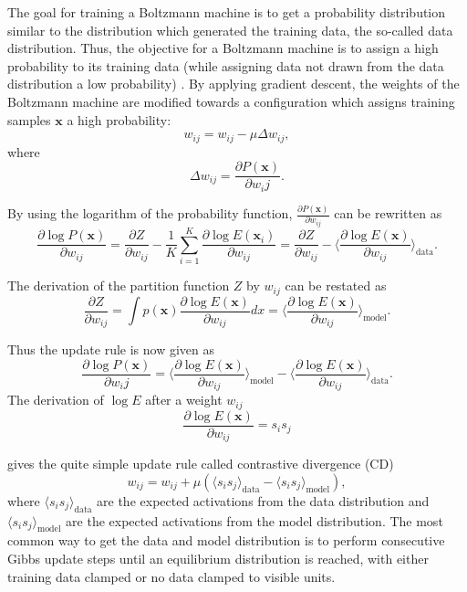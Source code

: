 The goal for training a Boltzmann machine is to get a probability distribution similar to the distribution which generated the training data, the so-called data distribution.
Thus, the objective for a Boltzmann machine is to assign a high probability to its training data (while assigning data not drawn from the data distribution a low probability) \cite{ackley1985learning} \cite{hinton2002training} \cite{Woodford2002} \cite{Bengio2009}.
By applying gradient descent, the weights of the Boltzmann machine are modified towards a configuration which assigns training samples $\textbf{x}$ a high probability:
\[
w_{ij} = w_{ij} - \mu \Delta w_{ij},
\]
where
\[
\Delta w_{ij} = \frac{\partial P(\textbf{x})}{\partial w_ij}.
\]

By using the logarithm of the probability function, $\frac{\partial P(\textbf{x})}{\partial w_{ij}}$ can be rewritten as
\[
\frac{\partial \log P(\textbf{x})}{\partial w_{ij}} = \frac{\partial Z}{\partial w_{ij}} - \frac{1}{K} \sum_{i=1}^K \frac{\partial \log E(\textbf{x}_i)}{\partial w_{ij}} =  \frac{\partial Z}{\partial w_{ij}} - \Big \langle \frac{\partial \log E(\textbf{x})}{\partial w_{ij}} \Big \rangle_{\text{data}}.
\]    

The derivation of the partition function $Z$ by $w_{ij}$ can be restated as
\[
 \frac{\partial Z}{\partial w_{ij}} = \int p(\textbf{x}) \frac{\partial \log E(\textbf{x})}{\partial w_{ij}} dx = \Big \langle \frac{\partial \log E(\textbf{x})}{\partial w_{ij}} \Big \rangle_{\text{model}}.
\]

Thus the update rule is now given as
\[
\frac{\partial \log P(\textbf{x})}{\partial w_ij} =  \Big \langle \frac{\partial \log E(\textbf{x})}{\partial w_{ij}} \Big \rangle_{\text{model}} - \Big \langle \frac{\partial \log E(\textbf{x})}{\partial w_{ij}} \Big \rangle_{\text{data}}.
\]
The derivation of $\log E$ after a weight $w_{ij}$
\[
\frac{\partial \log E(\textbf{x})}{\partial w_{ij}} = s_i s_j
\]

gives the quite simple update rule called contrastive divergence (CD)
\[
w_{ij}= w_{ij} + \mu ( \langle s_i s_j \rangle_{\text{data}} - \langle s_i s_j \rangle_{\text{model}} ) ,
\]
where $\langle s_i s_j \rangle_{\text{data}}$ are the expected activations from the data distribution and  $ \langle s_i s_j \rangle_{\text{model}}$ are the expected activations from the model distribution.
The most common way to get the data and model distribution is to perform consecutive Gibbs update steps until an equilibrium distribution is reached, with either training data clamped or no data clamped to visible units.

